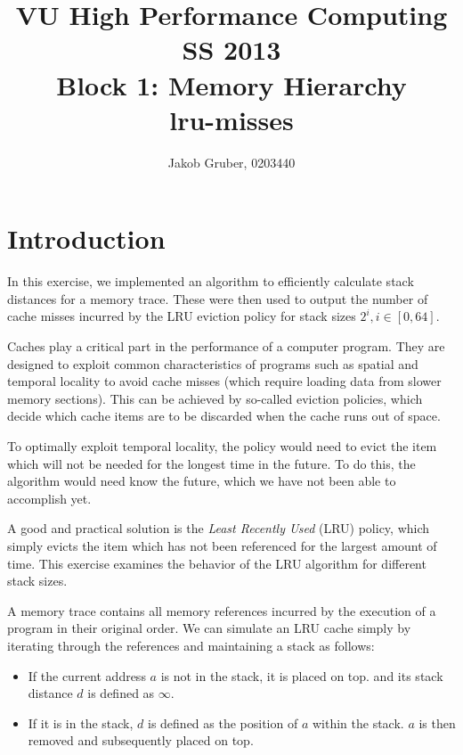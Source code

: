 \documentclass[a4paper,10pt]{article}
\title{VU High Performance Computing \\
       SS 2013 \\
       Block 1: Memory Hierarchy \\
       lru-misses}
\author{Jakob Gruber, 0203440}
\begin{document}
\maketitle

\tableofcontents

\pagebreak

\section{Introduction} \label{section:introduction}

In this exercise, we implemented an algorithm to efficiently calculate stack distances
for a memory trace. These were then used to output the number of cache misses incurred by the
LRU eviction policy for stack sizes $2^i, i \in [0, 64]$.

Caches play a critical part in the performance of a computer program.
They are designed to exploit common characteristics of programs such as
spatial and temporal locality to avoid cache misses (which require
loading data from slower memory sections). This can be achieved by
so-called eviction policies, which decide which cache items are
to be discarded when the cache runs out of space.

To optimally exploit temporal locality, the policy would need to evict
the item which will not be needed for the longest time in the future. To do this, the algorithm would need know the future, which we have not been able to accomplish yet.

A good and practical solution is the \emph{Least Recently Used} (LRU)
policy, which simply evicts the item which has not been referenced for the largest amount of time. This exercise examines the behavior of the LRU algorithm for different stack sizes.

A memory trace contains all memory references incurred by the execution
of a program in their original order. We can simulate an LRU cache simply by iterating through the references and maintaining a stack as follows: 

\begin{itemize}
\item If the current address $a$ is not in the stack, it is placed on top.      and its stack distance $d$ is defined as $\infty$.
\item If it is in the stack, $d$ is defined as the position of $a$ within the stack.
      $a$ is then removed and subsequently placed on top.
\end{itemize}
\end{document}
